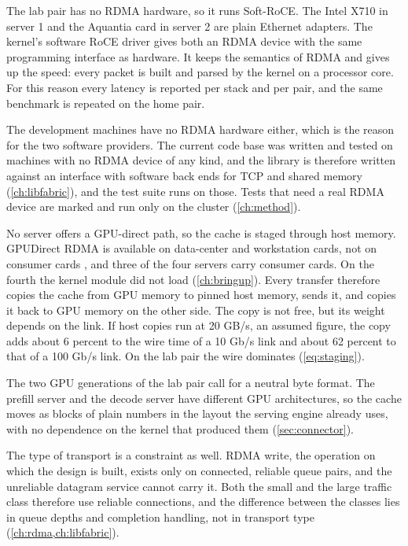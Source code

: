 The lab pair has no RDMA hardware, so it runs Soft-RoCE. The Intel X710 in
server 1 and the Aquantia card in server 2 are plain Ethernet adapters. The
kernel's software RoCE driver gives both an RDMA device with the same
programming interface as hardware. It keeps the semantics of RDMA and gives up
the speed: every packet is built and parsed by the kernel on a processor core.
For this reason every latency is reported per stack and per pair,
and the same benchmark is repeated on the home pair.

The development machines have no RDMA hardware either, which is the reason
for the two software providers. The current code base was written and tested
on machines with no RDMA device of any kind, and the library is therefore
written against an interface with
software back ends for TCP and shared memory (\cref{ch:libfabric}), and the
test suite runs on those. Tests that need a real RDMA device are marked and
run only on the cluster (\cref{ch:method}).

No server offers a GPU-direct path, so the cache is staged through host
memory. GPUDirect RDMA is available on
data-center and workstation cards, not on consumer cards \citep{gpudirect},
and three of the four servers carry consumer cards. On the fourth the kernel
module did not load (\cref{ch:bringup}). Every transfer therefore copies the cache from GPU memory to pinned host memory, sends it,
and copies it back to GPU memory on the other side. The copy is not free, but
its weight depends on the link. If host copies run at 20 GB/s, an assumed
figure, the copy adds about 6 percent to the wire time of a 10 Gb/s link and
about 62 percent to that of a 100 Gb/s link. On the lab pair the wire
dominates (\cref{eq:staging}).

The two GPU generations of the lab pair call for a neutral byte format. The
prefill server and the decode server have different GPU architectures, so the
cache moves as
blocks of plain numbers in the layout the serving engine already uses, with no
dependence on the kernel that produced them (\cref{sec:connector}).

The type of transport is a constraint as well. RDMA write, the operation
on which the design is built, exists only on connected, reliable queue pairs,
and the unreliable datagram service cannot carry it. Both the small and the
large traffic class therefore use reliable connections, and the difference
between the classes lies in queue depths and completion handling, not in
transport type (\cref{ch:rdma,ch:libfabric}).

